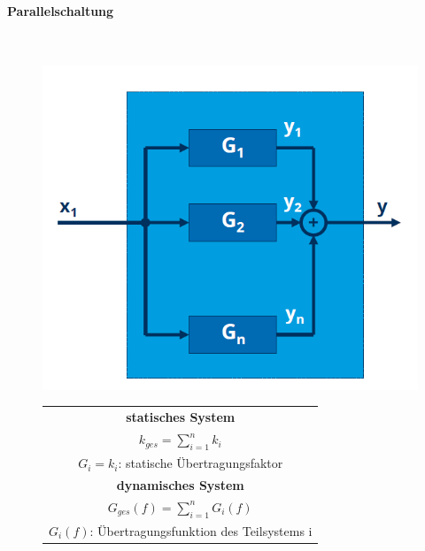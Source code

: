 \documentclass[12pt,a4paper]{article}
\begin{document}
\paragraph{Parallelschaltung}
\hspace{1pt}\\

\begin{minipage}{\linewidth}
\centering
\begin{minipage}{0.45\linewidth}
\begin{figure}[H]
\includegraphics[width=
\linewidth]{./resources/parallelschaltung.png}
\end{figure}
\end{minipage}
\hspace{0.05\linewidth}
\begin{minipage}{0.45\linewidth}
\begin{figure}[H]
\begin{tabular}{|c|}
\hline
\textbf{statisches System}\\
$\displaystyle k_{ges} = \sum_{i=1}^n k_i$\\
\hline
$G_i = k_i$: statische Übertragungsfaktor\\
\hline
\textbf{dynamisches System}\\
$\displaystyle G_{ges}(f) = \sum_{i=1}^n G_i(f)$\\
\hline
$G_i(f)$: Übertragungsfunktion des Teilsystems i\\
\hline
\end{tabular}
\end{figure}
\end{minipage}
\end{minipage}
\end{document}
